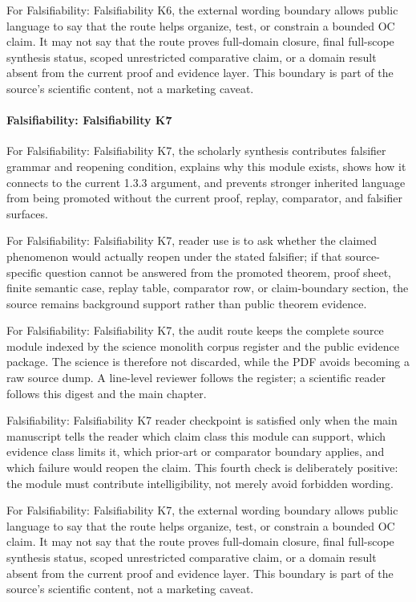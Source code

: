 For Falsifiability: Falsifiability K6, the external wording boundary allows public language to say that the route helps organize, test, or constrain a bounded OC claim. It may not say that the route proves full-domain closure, final full-scope synthesis status, scoped unrestricted comparative claim, or a domain result absent from the current proof and evidence layer. This boundary is part of the source's scientific content, not a marketing caveat.


\paragraph{Falsifiability: Falsifiability K7}

For Falsifiability: Falsifiability K7, the scholarly synthesis contributes falsifier grammar and reopening condition, explains why this module exists, shows how it connects to the current 1.3.3 argument, and prevents stronger inherited language from being promoted without the current proof, replay, comparator, and falsifier surfaces.


For Falsifiability: Falsifiability K7, reader use is to ask whether the claimed phenomenon would actually reopen under the stated falsifier; if that source-specific question cannot be answered from the promoted theorem, proof sheet, finite semantic case, replay table, comparator row, or claim-boundary section, the source remains background support rather than public theorem evidence.


For Falsifiability: Falsifiability K7, the audit route keeps the complete source module indexed by the science monolith corpus register and the public evidence package. The science is therefore not discarded, while the PDF avoids becoming a raw source dump. A line-level reviewer follows the register; a scientific reader follows this digest and the main chapter.


Falsifiability: Falsifiability K7 reader checkpoint is satisfied only when the main manuscript tells the reader which claim class this module can support, which evidence class limits it, which prior-art or comparator boundary applies, and which failure would reopen the claim. This fourth check is deliberately positive: the module must contribute intelligibility, not merely avoid forbidden wording.


For Falsifiability: Falsifiability K7, the external wording boundary allows public language to say that the route helps organize, test, or constrain a bounded OC claim. It may not say that the route proves full-domain closure, final full-scope synthesis status, scoped unrestricted comparative claim, or a domain result absent from the current proof and evidence layer. This boundary is part of the source's scientific content, not a marketing caveat.


